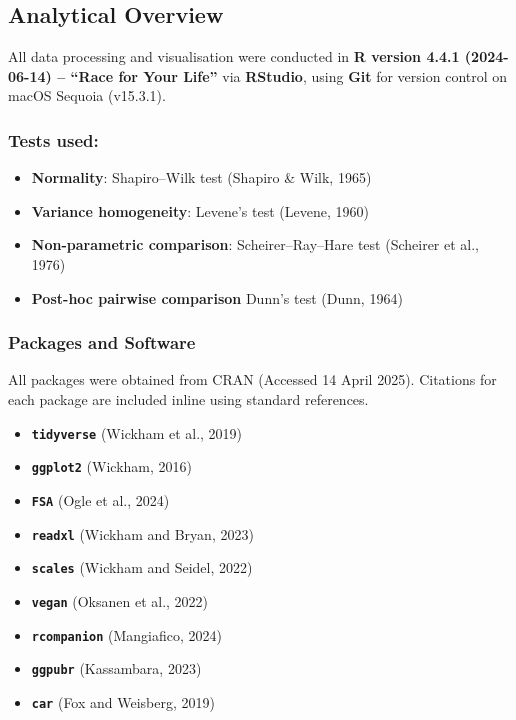 \documentclass[
]{article}
\providecommand{\tightlist}{%
  \setlength{\itemsep}{0pt}\setlength{\parskip}{0pt}}
\begin{document}
\subsection{Analytical Overview}\label{analytical-overview}

All data processing and visualisation were conducted in \textbf{R
version 4.4.1 (2024-06-14) -- ``Race for Your Life''} via
\textbf{RStudio}, using \textbf{Git} for version control on macOS
Sequoia (v15.3.1).

\subsubsection{Tests used:}\label{tests-used}

\begin{itemize}
\tightlist
\item
  \textbf{Normality}: Shapiro--Wilk test (Shapiro \& Wilk, 1965)
\item
  \textbf{Variance homogeneity}: Levene's test (Levene, 1960)
\item
  \textbf{Non-parametric comparison}: Scheirer--Ray--Hare test (Scheirer
  et al., 1976)
\item
  \textbf{Post-hoc pairwise comparison} Dunn's test (Dunn, 1964)
\end{itemize}

\subsubsection{Packages and Software}\label{packages-and-software}

All packages were obtained from CRAN (Accessed 14 April 2025). Citations
for each package are included inline using standard references.

\begin{itemize}
\tightlist
\item
  \textbf{\texttt{tidyverse}} (Wickham et al., 2019)
\item
  \textbf{\texttt{ggplot2}} (Wickham, 2016)
\item
  \textbf{\texttt{FSA}} (Ogle et al., 2024)
\item
  \textbf{\texttt{readxl}} (Wickham and Bryan, 2023)
\item
  \textbf{\texttt{scales}} (Wickham and Seidel, 2022)
\item
  \textbf{\texttt{vegan}} (Oksanen et al., 2022)
\item
  \textbf{\texttt{rcompanion}} (Mangiafico, 2024)
\item
  \textbf{\texttt{ggpubr}} (Kassambara, 2023)
\item
  \textbf{\texttt{car}} (Fox and Weisberg, 2019)
\end{itemize}
\end{document}
